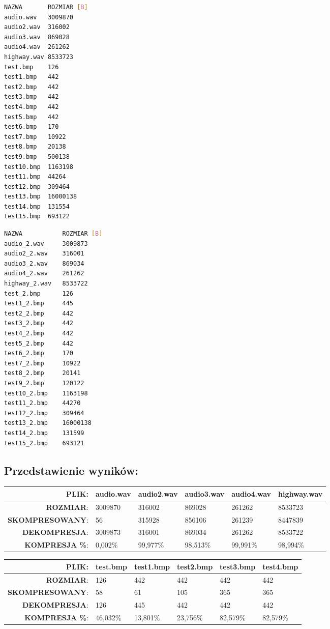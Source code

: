 \documentclass[12pt,a4paper,notitlepage]{report}
\begin{document}
\begin{minipage}{.48\textwidth}
\begin{lstlisting}[language=bash,caption={Przedstawienie plików przed kompresją.}]
NAZWA		ROZMIAR [B]
audio.wav	3009870
audio2.wav	316002
audio3.wav	869028
audio4.wav	261262
highway.wav	8533723
test.bmp	126
test1.bmp	442
test2.bmp	442
test3.bmp	442
test4.bmp	442
test5.bmp	442
test6.bmp	170
test7.bmp	10922
test8.bmp	20138
test9.bmp	500138
test10.bmp	1163198
test11.bmp	44264
test12.bmp	309464
test13.bmp	16000138
test14.bmp	131554
test15.bmp	693122
\end{lstlisting}
\end{minipage}
\hfill
\begin{minipage}{.48\textwidth}
\begin{lstlisting}[language=bash,caption={Przedstawienie plików po dekompresji.}]
NAZWA			ROZMIAR [B]
audio_2.wav		3009873
audio2_2.wav	316001
audio3_2.wav	869034
audio4_2.wav	261262
highway_2.wav	8533722
test_2.bmp		126
test1_2.bmp		445
test2_2.bmp		442
test3_2.bmp		442
test4_2.bmp		442
test5_2.bmp		442
test6_2.bmp		170
test7_2.bmp		10922
test8_2.bmp		20141
test9_2.bmp		120122
test10_2.bmp	1163198
test11_2.bmp	44270
test12_2.bmp	309464
test13_2.bmp	16000138
test14_2.bmp	131599
test15_2.bmp	693121
\end{lstlisting}
\end{minipage}

\subsection{Przedstawienie wyników:}
\begin{table}[H]
\begin{tabular}{r|l|l|l|l|l|}\hline
\textbf{PLIK}:	&	audio.wav	&	audio2.wav	&	audio3.wav	&	audio4.wav	&	highway.wav	\\\hline
\textbf{ROZMIAR}:	&	3009870	&	316002	&	869028	&	261262	&	8533723	\\\hline
\textbf{SKOMPRESOWANY}:	&	56	&	315928	&	856106	&	261239	&	8447839	\\\hline
\textbf{DEKOMPRESJA}:	&	3009873	&	316001	&	869034	&	261262	&	8533722	\\\hline
\textbf{KOMPRESJA \%}:	&	0,002\%	&	99,977\%	&	98,513\%	&	99,991\%	&	98,994\%	\\\hline
\end{tabular}
\end{table}

\begin{table}[H]
\begin{tabular}{r|l|l|l|l|l|}\hline
\textbf{PLIK}:	&	test.bmp	&	test1.bmp	&	test2.bmp	&	test3.bmp	&	test4.bmp	\\\hline
\textbf{ROZMIAR}:	&	126	&	442	&	442	&	442	&	442	\\\hline
\textbf{SKOMPRESOWANY}:	&	58	&	61	&	105	&	365	&	365	\\\hline
\textbf{DEKOMPRESJA}:	&	126	&	445	&	442	&	442	&	442	\\\hline
\textbf{KOMPRESJA \%}:	&	46,032\%	&	13,801\%	&	23,756\%	&	82,579\%	&	82,579\%	\\\hline
\end{tabular}
\end{table}
\end{document}
